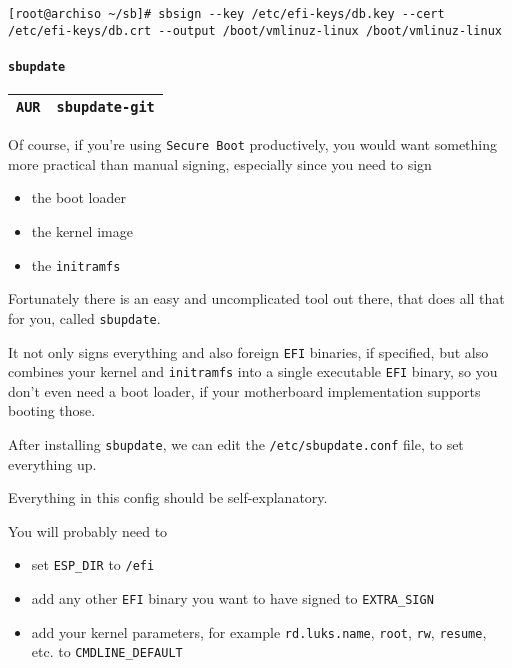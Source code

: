 \documentclass[9pt]{report}
\begin{document}
\begin{verbatim}
[root@archiso ~/sb]# sbsign --key /etc/efi-keys/db.key --cert /etc/efi-keys/db.crt --output /boot/vmlinuz-linux /boot/vmlinuz-linux
\end{verbatim}


\vfill\eject

\hypertarget{x-sbupdate}{\paragraph{\texttt{sbupdate}}}
\begin{center}
\begin{tabular}{|c|c|}
\hline
\texttt{AUR} & \texttt{sbupdate-git} \\ 
\hline
\end{tabular}
\end{center}

Of course, if you’re using \texttt{Secure Boot} productively, you would want something more practical than manual signing, especially since you need to sign


\begin{itemize}

\item the boot loader

\item the kernel image

\item the \texttt{initramfs}

\end{itemize}


Fortunately there is an easy and uncomplicated tool out there, that does all that for you, called \texttt{sbupdate}.


It not only signs everything and also foreign \texttt{EFI} binaries, if specified, but also combines your kernel and \texttt{initramfs} into a single executable \texttt{EFI} binary, so you don’t even need a boot loader, if your motherboard implementation supports booting those.


After installing \texttt{sbupdate}, we can edit the \texttt{/etc/sbupdate.conf} file, to set everything up.


Everything in this config should be self-explanatory.


You will probably need to


\begin{itemize}

\item set \texttt{ESP\_DIR} to \texttt{/efi}

\item add any other \texttt{EFI} binary you want to have signed to \texttt{EXTRA\_SIGN}

\item add your kernel parameters, for example \texttt{rd.luks.name}, \texttt{root}, \texttt{rw}, \texttt{resume}, etc. to \texttt{CMDLINE\_DEFAULT}

\end{itemize}
\end{document}
